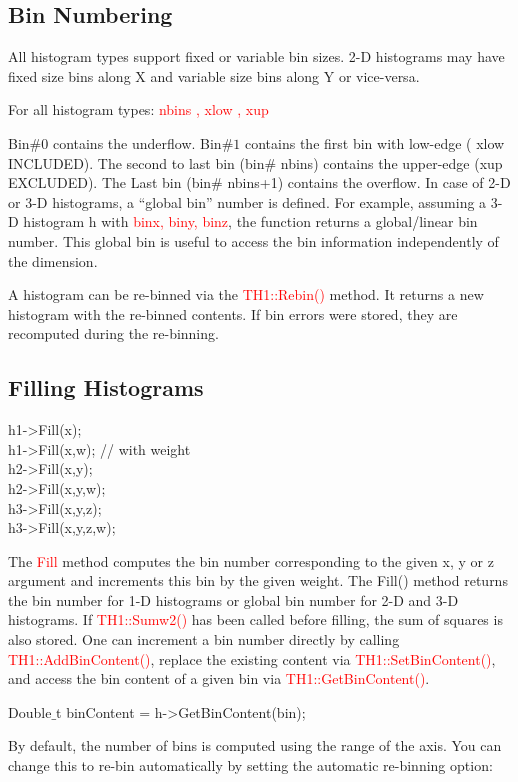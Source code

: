 \documentclass[12pt,a4paper]{article}
\begin{document}
\subsection{Bin Numbering}
All histogram types support fixed or variable bin sizes. 2-D histograms may have fixed size bins along X and variable size bins along Y or vice-versa.

For all histogram types: \textcolor{red}{nbins , xlow , xup}

Bin$\# 0$ contains the underflow. Bin$\# 1$ contains the first bin with low-edge ( xlow INCLUDED). The second to last bin (bin$\#$ nbins) contains the upper-edge (xup EXCLUDED). The Last bin (bin$\#$ nbins+1) contains the overflow. In case of 2-D or 3-D histograms, a ``global bin” number is defined. For example, assuming a 3-D histogram h with \textcolor{red}{binx, biny, binz}, the function returns a global/linear bin number. This global bin is useful to access the bin information independently of the dimension.

A histogram can be re-binned via the \textcolor{red}{TH1::Rebin()} method. It returns a new histogram with the re-binned contents. If bin errors were stored, they are recomputed during the re-binning.

\subsection{Filling Histograms}
h1->Fill(x); \\
h1->Fill(x,w); // with weight \\
h2->Fill(x,y); \\
h2->Fill(x,y,w); \\
h3->Fill(x,y,z); \\
h3->Fill(x,y,z,w);

The \textcolor{red}{Fill} method computes the bin number corresponding to the given x, y or z argument and increments this bin by the given weight. The Fill() method returns the bin number for 1-D histograms or global bin number for 2-D and 3-D histograms. If \textcolor{red}{TH1::Sumw2()} has been called before filling, the sum of squares is also stored. One can increment a bin number directly by calling  \textcolor{red}{TH1::AddBinContent()}, replace the existing content via  \textcolor{red}{TH1::SetBinContent()}, and access the bin content of a given bin via  \textcolor{red}{TH1::GetBinContent()}.

Double$\_$t binContent = h->GetBinContent(bin);

By default, the number of bins is computed using the range of the axis. You can change this to re-bin automatically by setting the automatic re-binning option:
\end{document}
